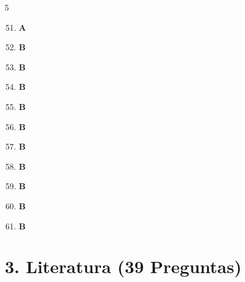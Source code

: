 \documentclass[10pt,a4paper]{article}
\begin{document}
\vspace{0.4cm}
\begin{tcolorbox}[colback=gray!5!white,colframe=gray!60!black,title=\textbf{CLAVE DE RESPUESTAS -- LENGUAJE}]
\begin{multicols}{5}
\begin{enumerate}[label=\textbf{\arabic*.}]
\setcounter{enumi}{50}
  \item \textbf{A}
  \item \textbf{B}
  \item \textbf{B}
  \item \textbf{B}
  \item \textbf{B}
  \item \textbf{B}
  \item \textbf{B}
  \item \textbf{B}
  \item \textbf{B}
  \item \textbf{B}
  \item \textbf{B}
\end{enumerate}
\end{multicols}
\end{tcolorbox}
\newpage\n
\section{3. Literatura (39 Preguntas)}
\end{document}
